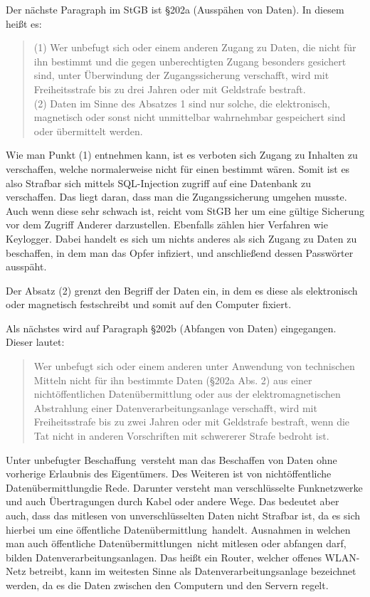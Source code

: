 \documentclass[10pt,a4paper]{article}
\begin{document}
Der nächste Paragraph im StGB ist §202a (Ausspähen von Daten). In diesem heißt es:
\begin{quote}
(1) Wer unbefugt sich oder einem anderen Zugang zu Daten, die nicht für ihn bestimmt und die gegen unberechtigten Zugang besonders gesichert sind, unter Überwindung der Zugangssicherung verschafft, wird mit Freiheitsstrafe bis zu drei Jahren oder mit Geldstrafe bestraft.\\
(2) Daten im Sinne des Absatzes 1 sind nur solche, die elektronisch, magnetisch oder sonst nicht unmittelbar wahrnehmbar gespeichert sind oder übermittelt werden.
\end{quote}

Wie man Punkt (1) entnehmen kann, ist es verboten sich Zugang zu Inhalten zu verschaffen, welche normalerweise nicht für einen bestimmt wären. Somit ist es also Strafbar sich mittels SQL-Injection zugriff auf eine Datenbank zu verschaffen. Das liegt daran, dass man die Zugangssicherung umgehen musste. Auch wenn diese sehr schwach ist, reicht vom StGB her um eine gültige Sicherung vor dem Zugriff Anderer darzustellen. Ebenfalls zählen hier Verfahren wie Keylogger. Dabei handelt es sich um nichts anderes als sich Zugang zu Daten zu beschaffen, in dem man das Opfer infiziert, und anschließend dessen Passwörter ausspäht. 

Der Absatz (2) grenzt den Begriff der Daten ein, in dem es diese als elektronisch oder magnetisch festschreibt und somit auf den Computer fixiert. 

Als nächstes wird auf Paragraph §202b (Abfangen von Daten) eingegangen. Dieser lautet:
\begin{quote}
Wer unbefugt sich oder einem anderen unter Anwendung von technischen Mitteln nicht für ihn bestimmte Daten (§202a Abs. 2) aus einer nichtöffentlichen Datenübermittlung oder aus der elektromagnetischen Abstrahlung einer Datenverarbeitungsanlage verschafft, wird mit Freiheitsstrafe bis zu zwei Jahren oder mit Geldstrafe bestraft, wenn die Tat nicht in anderen Vorschriften mit schwererer Strafe bedroht ist.
\end{quote}
Unter \glqq unbefugter Beschaffung\grqq \ versteht man das Beschaffen von Daten ohne vorherige Erlaubnis des Eigentümers. Des Weiteren ist von \glqq nichtöffentliche Datenübermittlung\grqq die Rede. Darunter versteht man verschlüsselte Funknetzwerke und auch Übertragungen durch Kabel oder andere Wege. Das bedeutet aber auch, dass das mitlesen von unverschlüsselten Daten nicht Strafbar ist, da es sich hierbei um eine \glqq öffentliche Datenübermittlung\grqq \ handelt. Ausnahmen in welchen man auch \glqq öffentliche Datenübermittlungen\grqq \  nicht mitlesen oder abfangen darf, bilden Datenverarbeitungsanlagen. Das heißt ein Router, welcher offenes WLAN-Netz betreibt, kann im weitesten Sinne als Datenverarbeitungsanlage bezeichnet werden, da es die Daten zwischen den Computern und den Servern regelt.
\end{document}
